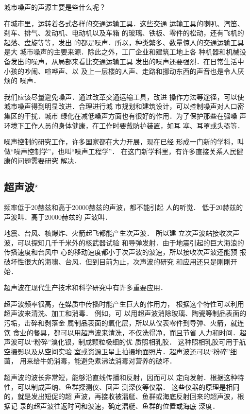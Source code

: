 城市噪声的声源主要是些什么呢？

在城市里，运转着各式各样的交通运输工具．这些交通
运输工具的喇叭、汽笛、刹车、排气、发动机、电动机以及车箱
的玻璃、铁板、零件的松动，还有飞机的起落、盘旋等等，发出
的都是噪声．所以，种类繁多、数量惊人的交通运输工具是大
城市噪声的主要来源．除此之外，工厂企业和建筑工地上各
种机器和机械设备发出的噪声，从局部来看比交通运输工具
发出的噪声还要强烈．在日常生活中小孩的吵闹、喧哗声、以
及上一层楼的人声、走路和挪动东西的声音也是令人厌烦的
噪声．

我们应该尽量避免噪声．通过改革交通运输工具，改进
操作方法等途径，可以使城市噪声得到明显改进．合理进行城
市规划和建筑设计，可以控制噪声对人口密集区的干扰．城市
绿化在减低噪声方面也有很好的作用．为了保护那些在强噪
声环境下工作人员的身体健康，在工作时要戴防护装置，如耳
塞、耳罩或头盔等．

噪声控制的研究工作，许多国家都在大力开展，现在已经
形成一门新的学科，叫做“噪声控制学”，也叫“噪声工程学”．
在这门新学科里，有许多直接关系人民健康的问题需要研究
解决．

\subsection{超声波$^\star$}
频率低于20赫兹和高于20000赫兹的声波，都不能引起
人的听觉．
低于20赫兹的声波叫．高于20000赫兹的
声波叫．

地震、台风、核爆炸、火箭起飞都能产生次声波．
所以建
立次声波站接收次声波，可以探知几千千米外的核武器试验
和导弹发射．由于地震引起的巨大海浪的传播速度和台风中
心的移动速度都小于次声波的波速，所以接收次声波还能预
报破坏性很大的海啸、台风．但到目前为止，次声波的研究
和应用还只是刚刚开始．

超声波在现代生产技术和科学研究中有许多重要应用．

超声波频率很高，在媒质中传播时能产生巨大的作用力，
根据这个特性可以利用超声波来清洗、加工和消毒．
例如，可
以用超声波消除玻璃、陶瓷等制品表面的污垢，击碎和剥落金
属制品表面的氧化层，所以从仪表零件到导弹、火箭，就连饮
食业的餐具，都可以用超声波来清洗，不仅洗得净，而且节省
人力和时间．超声波可以“粉碎”溴化银，制成颗粒极细的优
质照相乳胶．
这种照相乳胶可用于航空摄影以及从空间实验
室或资源卫星上拍摄地面照片．超声波还可以“粉碎”细菌，
用来给牛奶消毒，能避免煮沸法消毒对营养的破坏．

超声波的波长非常短，能够沿直线传播和反射，因而可以
定向发射．根据这种特性，可以制成声纳、鱼群探测仪、回声
测深仪等仪器．
这些仪器的原理是相同的，就是发出短促的超
声波，再接收被潜艇、鱼群或海底反射回来的超声波，根据记
录的超声波往返时间和波速，确定潜艇、鱼群的位置或海底
深度．

